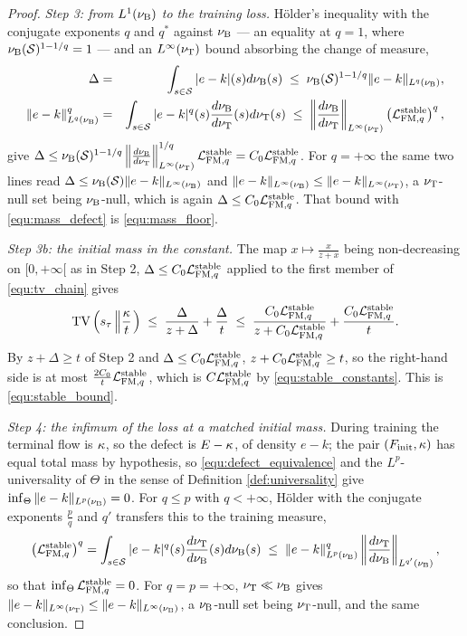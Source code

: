 \begin{proof}
\emph{Step 3: from $L^1(\nu_{\mathrm{B}})$ to the training loss.} H\"older's inequality with the conjugate exponents $q$ and $q^*$ against $\nu_{\mathrm{B}}$ --- an equality at $q=1$, where $\nu_{\mathrm{B}}(\mathcal S)^{1-1/q}=1$ --- and an $L^\infty(\nu_{\mathrm{T}})$ bound absorbing the change of measure,
\begin{eqnarray}
    \Delta &=& \int_{s\in\mathcal S}|e-k|(s)d\nu_{\mathrm{B}}(s)\;\leq\;\nu_{\mathrm{B}}(\mathcal S)^{1-1/q}\|e-k\|_{L^q(\nu_{\mathrm{B}})},\\
    \|e-k\|^q_{L^q(\nu_{\mathrm{B}})} &=& \int_{s\in\mathcal S}|e-k|^q(s)\frac{d\nu_{\mathrm{B}}}{d\nu_{\mathrm{T}}}(s)d\nu_{\mathrm{T}}(s)\;\leq\;\left\|\frac{d\nu_{\mathrm{B}}}{d\nu_{\mathrm{T}}}\right\|_{L^\infty(\nu_{\mathrm{T}})}\left(\mathcal L_{\mathrm{FM},q}^{\mathrm{stable}}\right)^q,
\end{eqnarray}
give $\Delta\leq\nu_{\mathrm{B}}(\mathcal S)^{1-1/q}\left\|\frac{d\nu_{\mathrm{B}}}{d\nu_{\mathrm{T}}}\right\|^{1/q}_{L^\infty(\nu_{\mathrm{T}})}\mathcal L_{\mathrm{FM},q}^{\mathrm{stable}} = C_0\mathcal L_{\mathrm{FM},q}^{\mathrm{stable}}$. For $q=+\infty$ the same two lines read $\Delta\leq\nu_{\mathrm{B}}(\mathcal S)\|e-k\|_{L^\infty(\nu_{\mathrm{B}})}$ and $\|e-k\|_{L^\infty(\nu_{\mathrm{B}})}\leq\|e-k\|_{L^\infty(\nu_{\mathrm{T}})}$, a $\nu_{\mathrm{T}}$-null set being $\nu_{\mathrm{B}}$-null, which is again $\Delta\leq C_0\mathcal L_{\mathrm{FM},q}^{\mathrm{stable}}$. That bound with \eqref{equ:mass_defect} is \eqref{equ:mass_floor}.

\emph{Step 3b: the initial mass in the constant.} The map $x\mapsto\frac{x}{z+x}$ being non-decreasing on $[0,+\infty[$ as in Step 2, $\Delta\leq C_0\mathcal L_{\mathrm{FM},q}^{\mathrm{stable}}$ applied to the first member of \eqref{equ:tv_chain} gives
\begin{equation}
    \mathrm{TV}\left(s_\tau\left\|\frac{\kappa}{t}\right.\right)\;\leq\;\frac{\Delta}{z+\Delta}+\frac{\Delta}{t}\;\leq\;\frac{C_0\mathcal L_{\mathrm{FM},q}^{\mathrm{stable}}}{z+C_0\mathcal L_{\mathrm{FM},q}^{\mathrm{stable}}}+\frac{C_0\mathcal L_{\mathrm{FM},q}^{\mathrm{stable}}}{t} .
\end{equation}
By $z+\Delta\geq t$ of Step 2 and $\Delta\leq C_0\mathcal L_{\mathrm{FM},q}^{\mathrm{stable}}$, $z+C_0\mathcal L_{\mathrm{FM},q}^{\mathrm{stable}}\geq t$, so the right-hand side is at most $\frac{2C_0}{t}\mathcal L_{\mathrm{FM},q}^{\mathrm{stable}}$, which is $C\mathcal L_{\mathrm{FM},q}^{\mathrm{stable}}$ by \eqref{equ:stable_constants}. This is \eqref{equ:stable_bound}.

\emph{Step 4: the infimum of the loss at a matched initial mass.} During training the terminal flow is $\kappa$, so the defect is $E-\kappa$, of density $e-k$; the pair $(F_{\mathrm{init}},\kappa)$ has equal total mass by hypothesis, so \eqref{equ:defect_equivalence} and the $L^p$-universality of $\Theta$ in the sense of Definition \ref{def:universality} give $\inf_\Theta\|e-k\|_{L^p(\nu_{\mathrm{B}})} = 0$. For $q\leq p$ with $q<+\infty$, H\"older with the conjugate exponents $\frac pq$ and $q'$ transfers this to the training measure,
\begin{equation}
    \left(\mathcal L_{\mathrm{FM},q}^{\mathrm{stable}}\right)^q = \int_{s\in\mathcal S}|e-k|^q(s)\frac{d\nu_{\mathrm{T}}}{d\nu_{\mathrm{B}}}(s)d\nu_{\mathrm{B}}(s)\;\leq\;\|e-k\|^q_{L^p(\nu_{\mathrm{B}})}\left\|\frac{d\nu_{\mathrm{T}}}{d\nu_{\mathrm{B}}}\right\|_{L^{q'}(\nu_{\mathrm{B}})},
\end{equation}
so that $\inf_\Theta\mathcal L_{\mathrm{FM},q}^{\mathrm{stable}} = 0$. For $q=p=+\infty$, $\nu_{\mathrm{T}}\ll\nu_{\mathrm{B}}$ gives $\|e-k\|_{L^\infty(\nu_{\mathrm{T}})}\leq\|e-k\|_{L^\infty(\nu_{\mathrm{B}})}$, a $\nu_{\mathrm{B}}$-null set being $\nu_{\mathrm{T}}$-null, and the same conclusion.


\end{proof}
